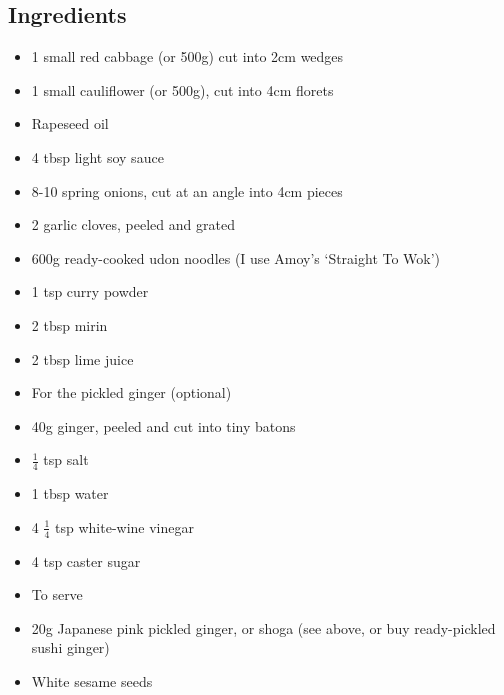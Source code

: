 \documentclass{book}
\begin{document}
\subsection*{Ingredients}
\begin{itemize}
\item 1 small red cabbage (or 500g) cut into 2cm wedges 
\item 1 small cauliflower (or 500g), cut into 4cm florets 
\item Rapeseed oil 
\item 4 tbsp light soy sauce 
\item 8-10 spring onions, cut at an angle into 4cm pieces
\item 2 garlic cloves, peeled and grated
\item 600g ready-cooked udon noodles (I use Amoy’s ‘Straight To Wok’) 
\item 1 tsp curry powder
\item 2 tbsp mirin
\item 2 tbsp lime juice
\end{itemize}

\begin{itemize}
\item For the pickled ginger (optional)
\item 40g ginger, peeled and cut into tiny batons
\item $\frac{1}{4}$ tsp salt
\item 1 tbsp water 
\item 4 $\frac{1}{4}$ tsp white-wine vinegar
\item 4 tsp caster sugar
\end{itemize}

\begin{itemize}
\item To serve
\item 20g Japanese pink pickled ginger, or shoga (see above, or buy ready-pickled sushi ginger)
\item White sesame seeds
\end{itemize}
\end{document}
